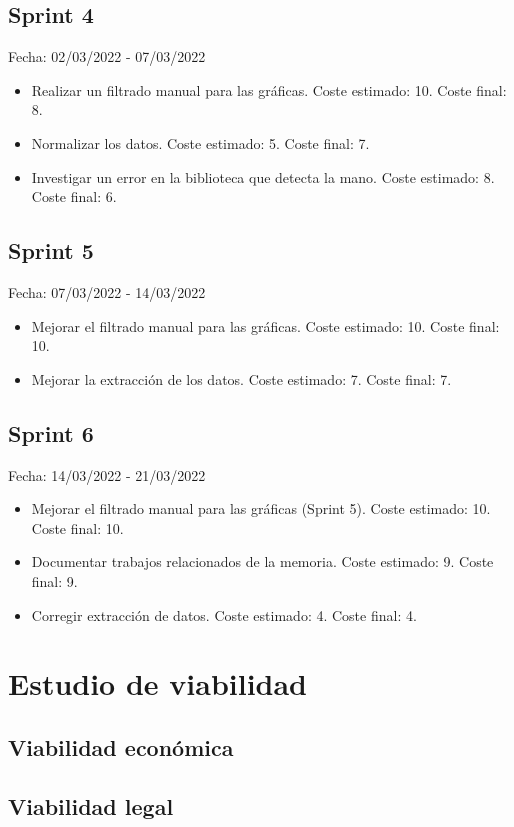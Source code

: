 \subsection{Sprint 4}
Fecha: 02/03/2022 - 07/03/2022
\begin{itemize}
	\item Realizar un filtrado manual para las gráficas. Coste estimado: 10. Coste final: 8. 
	\item Normalizar los datos. Coste estimado: 5. Coste final: 7.
	\item Investigar un error en la biblioteca que detecta la mano. Coste estimado: 8. Coste final: 6.
\end{itemize}

\subsection{Sprint 5}
Fecha: 07/03/2022 - 14/03/2022
\begin{itemize}
	\item Mejorar el filtrado manual para las gráficas. Coste estimado: 10. Coste final: 10.
	\item Mejorar la extracción de los datos. Coste estimado: 7. Coste final: 7.
\end{itemize}

\subsection{Sprint 6}
Fecha: 14/03/2022 - 21/03/2022
\begin{itemize}
	\item Mejorar el filtrado manual para las gráficas (Sprint 5). Coste estimado: 10. Coste final: 10.
	\item Documentar trabajos relacionados de la memoria. Coste estimado: 9. Coste final: 9.
	\item Corregir extracción de datos. Coste estimado: 4. Coste final: 4.
\end{itemize}

\section{Estudio de viabilidad}

\subsection{Viabilidad económica}

\subsection{Viabilidad legal}
